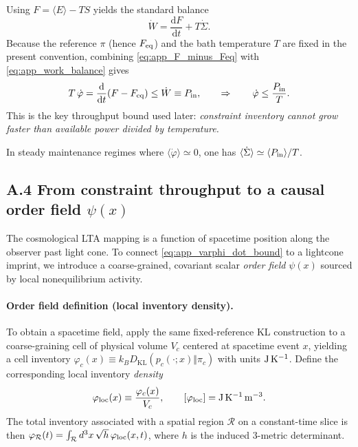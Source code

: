 \documentclass[10pt]{article}
\providecommand{\dd}{\mathrm{d}}
\begin{document}
Using $F=\langle E\rangle-TS$ yields the standard balance
\begin{equation}
\dot W = \frac{\dd F}{\dd t} + T\dot\Sigma.
\label{eq:app_work_balance}
\end{equation}
Because the reference $\pi$ (hence $F_{\rm eq}$) and the bath temperature $T$ are fixed in the present convention,
combining \eqref{eq:app_F_minus_Feq} with \eqref{eq:app_work_balance} gives
\begin{equation}
T\,\dot\varphi = \frac{\dd}{\dd t}(F-F_{\rm eq}) \le \dot W \equiv P_{\rm in},
\qquad\Rightarrow\qquad
\dot\varphi \le \frac{P_{\rm in}}{T}.
\label{eq:app_varphi_dot_bound}
\end{equation}
This is the key throughput bound used later: \emph{constraint inventory cannot grow faster than
available power divided by temperature.}

In steady maintenance regimes where $\langle \dot\varphi\rangle\simeq0$, one has
$\langle \dot\Sigma\rangle\simeq \langle P_{\rm in}\rangle/T$.

\subsection{A.4 From constraint throughput to a causal order field $\psi(x)$}
\label{app:psi_field}

The cosmological LTA mapping is a function of spacetime position along the observer past light cone.
To connect \eqref{eq:app_varphi_dot_bound} to a lightcone imprint, we introduce a coarse-grained,
covariant scalar \emph{order field} $\psi(x)$ sourced by local nonequilibrium activity.

\paragraph{Order field definition (local inventory density).}
To obtain a spacetime field, apply the same fixed-reference KL construction to a coarse-graining cell
of physical volume $V_c$ centered at spacetime event $x$, yielding a cell inventory
$\varphi_c(x)\equiv k_B D_{\mathrm{KL}}(p_c(\cdot;x)\Vert \pi_c)$ with units ${\rm J\,K^{-1}}$.
Define the corresponding local inventory \emph{density}
\begin{equation}
\varphi_{\rm loc}(x)\equiv \frac{\varphi_c(x)}{V_c},
\qquad [\varphi_{\rm loc}]={\rm J\,K^{-1}\,m^{-3}}.
\end{equation}
The total inventory associated with a spatial region $\mathcal{R}$ on a constant-time slice is then
$\varphi_{\mathcal{R}}(t)=\int_{\mathcal{R}} d^3x\,\sqrt{h}\,\varphi_{\rm loc}(x,t)$, where $h$ is the induced 3-metric determinant.
\end{document}
